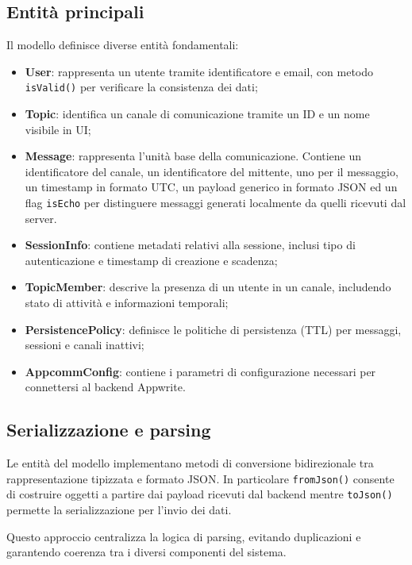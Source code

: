 \documentclass[a4paper, 11pt, twoside]{report}
\begin{document}
\subsection{Entità principali}

Il modello definisce diverse entità fondamentali:

\begin{itemize}
    \item \textbf{User}: rappresenta un utente tramite identificatore e email, con metodo \texttt{isValid()} per 
        verificare la consistenza dei dati;
    \item \textbf{Topic}: identifica un canale di comunicazione tramite un ID e un nome visibile in UI;
    \item \textbf{Message}: rappresenta l'unità base della comunicazione. Contiene un identificatore del canale, un 
        identificatore del mittente, uno per il messaggio, un timestamp in formato UTC, un payload generico in formato 
        JSON ed un flag \texttt{isEcho} per distinguere messaggi generati localmente da quelli ricevuti dal server.
    \item \textbf{SessionInfo}: contiene metadati relativi alla sessione, inclusi tipo di autenticazione 
        e timestamp di creazione e scadenza;
    \item \textbf{TopicMember}: descrive la presenza di un utente in un canale, includendo stato di attività e 
        informazioni temporali;
    \item \textbf{PersistencePolicy}: definisce le politiche di persistenza (\gls{TTL}) per messaggi, sessioni e canali inattivi;
    \item \textbf{AppcommConfig}: contiene i parametri di configurazione necessari per connettersi al backend Appwrite.
\end{itemize}

\subsection{Serializzazione e parsing}

Le entità del modello implementano metodi di conversione bidirezionale tra rappresentazione tipizzata e formato JSON. 
In particolare \texttt{fromJson()} consente di costruire oggetti a partire dai payload ricevuti dal backend mentre 
\texttt{toJson()} permette la serializzazione per l'invio dei dati.

Questo approccio centralizza la logica di parsing, evitando duplicazioni e garantendo coerenza tra i diversi componenti 
del sistema.
\end{document}
